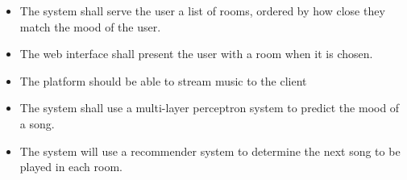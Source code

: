 \begin{itemize}
\item The system shall serve the user a list of rooms, ordered by how close they match the mood of the user.

\item The web interface shall present the user with a room when it is chosen.
	
\item The platform should be able to stream music to the client

\item The system shall use a multi-layer perceptron system to predict the mood of a song.

\item The system will use a recommender system to determine the next song to be played in each room.

\end{itemize}
